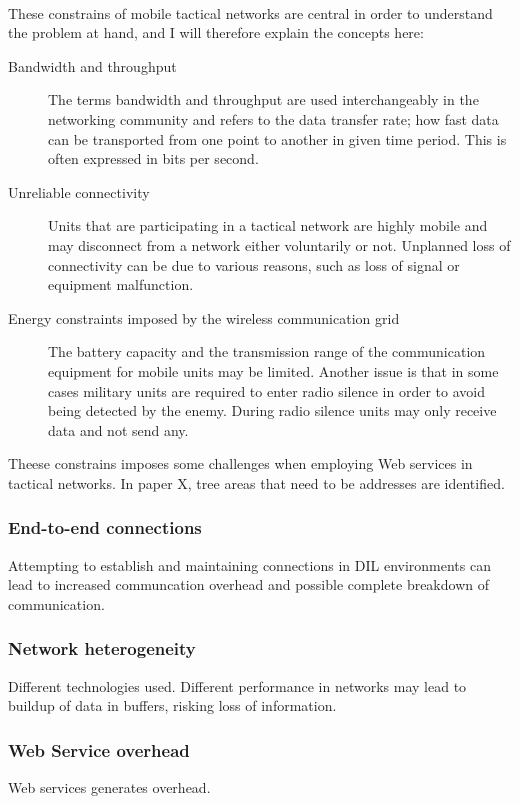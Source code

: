 \documentclass[USenglish]{article}
\begin{document}
\paragraph{}
These constrains of mobile tactical networks are central in order to understand the problem at hand, and I will therefore explain the concepts here:

\begin{description}
\item[Bandwidth and throughput] The terms bandwidth and throughput are used interchangeably in the networking community and refers to the data transfer rate; how fast data can be transported from one point to another in given time period. This is often expressed in bits per second.
\item[Unreliable connectivity] Units that are participating in a tactical network are highly mobile and may disconnect from a network either voluntarily or not. Unplanned loss of connectivity can be due to various reasons, such as loss of signal or equipment malfunction.
\item[Energy constraints imposed by the wireless communication grid] The battery capacity and the transmission range of the communication equipment for mobile units may be limited. Another issue is that in some cases military units are required to enter radio silence in order to avoid being detected by the enemy. During radio silence units may only receive data and not send any.
\end{description}

Theese constrains imposes some challenges when employing Web services in tactical networks. In paper X, tree areas that need to be addresses are identified\cite{IST-118}.

\label{section:DIL-problems}
\subsubsection{End-to-end connections}
Attempting to establish and maintaining connections in DIL environments can lead to increased communcation overhead and possible complete breakdown of communication.
\subsubsection{Network heterogeneity}
Different technologies used. Different performance in networks may lead to buildup of data in buffers, risking loss of information.
\subsubsection{Web Service overhead}
Web services generates overhead.
\end{document}
